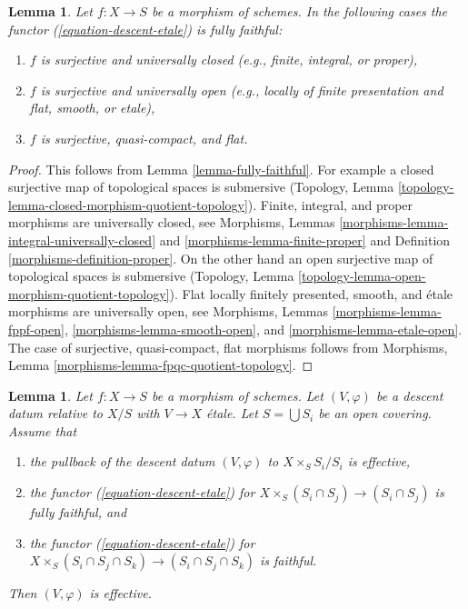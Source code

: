 \documentclass{stacks-project}
\theoremstyle{plain}
\newtheorem{lemma}[subsection]{Lemma}
\theoremstyle{definition}
\theoremstyle{remark}
\numberwithin{equation}{subsection}
\begin{document}
\begin{lemma}
\label{lemma-fully-faithful-cases}
Let $f : X \to S$ be a morphism of schemes. In the following
cases the functor (\ref{equation-descent-etale}) is fully faithful:
\begin{enumerate}
\item $f$ is surjective and universally closed
(e.g., finite, integral, or proper),
\item $f$ is surjective and universally open
(e.g., locally of finite presentation and flat, smooth, or etale),
\item $f$ is surjective, quasi-compact, and flat.
\end{enumerate}
\end{lemma}

\begin{proof}
This follows from Lemma \ref{lemma-fully-faithful}.
For example a closed surjective map of topological spaces
is submersive (Topology, Lemma
\ref{topology-lemma-closed-morphism-quotient-topology}).
Finite, integral, and proper morphisms are universally closed, see
Morphisms, Lemmas \ref{morphisms-lemma-integral-universally-closed} and
\ref{morphisms-lemma-finite-proper} and
Definition \ref{morphisms-definition-proper}.
On the other hand an open surjective map of topological spaces
is submersive (Topology, Lemma
\ref{topology-lemma-open-morphism-quotient-topology}).
Flat locally finitely presented, smooth, and \'etale morphisms are
universally open, see
Morphisms, Lemmas \ref{morphisms-lemma-fppf-open},
\ref{morphisms-lemma-smooth-open}, and
\ref{morphisms-lemma-etale-open}.
The case of surjective, quasi-compact, flat morphisms follows
from Morphisms, Lemma \ref{morphisms-lemma-fpqc-quotient-topology}.
\end{proof}

\begin{lemma}
\label{lemma-reduce-to-affine}
Let $f : X \to S$ be a morphism of schemes.
Let $(V, \varphi)$ be a descent datum relative to $X/S$
with $V \to X$ \'etale. Let $S = \bigcup S_i$ be an
open covering. Assume that
\begin{enumerate}
\item the pullback of the descent datum $(V, \varphi)$
to $X \times_S S_i/S_i$ is effective,
\item the functor (\ref{equation-descent-etale})
for $X \times_S (S_i \cap S_j) \to (S_i \cap S_j)$ is fully faithful, and
\item the functor (\ref{equation-descent-etale})
for $X \times_S (S_i \cap S_j \cap S_k) \to (S_i \cap S_j \cap S_k)$
is faithful.
\end{enumerate}
Then $(V, \varphi)$ is effective.
\end{lemma}
\end{document}
